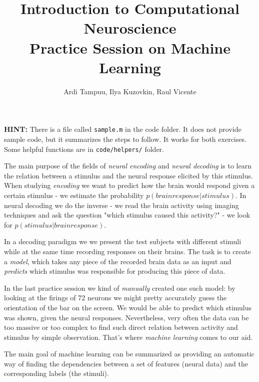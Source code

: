 \documentclass[a4paper,11pt]{article}
\author{\large{Ardi Tampuu, Ilya Kuzovkin, Raul Vicente}}
\title{\huge{Introduction to Computational Neuroscience}\\\LARGE{Practice Session on Machine Learning}}
\begin{document}
\maketitle

\textbf{HINT: } There is a file called \texttt{sample.m} in the code folder. It does not provide sample code, but it summarizes the steps to follow. It works for both exercises. Some helpful functions are in \texttt{code/helpers/} folder.

\vspace{0.8cm}
%
%
The main purpose of the fields of \emph{neural encoding} and \emph{neural decoding} is to learn the relation between a stimulus and the neural response elicited by this stimulus. When studying \emph{encoding} we want to predict how the brain would respond given a certain stimulus - we estimate the probability $p(brain response | stimulus)$. In neural decoding we do the inverse - we read the brain activity using imaging techniques and ask the question "which stimulus caused this activity?" - we look for $p(stimulus | brain response)$. 

In a decoding paradigm we we present the test subjects with different stimuli while at the same time recording responses on their brains. The task is to create a \emph{model}, which takes any piece of the recorded brain data as an input and \emph{predicts} which stimulus was responsible for producing this piece of data.

In the last practice session we kind of \emph{manually} created one such model: by looking at the firings of 72 neurons we might pretty accurately guess the orientation of the bar on the screen. We would be able to predict which stimulus was shown, given the neural responses. Nevertheless, very often the data can be too massive or too complex to find such direct relation between activity and stimulus by simple observation. That's where \emph{machine learning} comes to our aid.

The main goal of machine learning can be summarized as providing an automatic way of finding the dependencies between a set of features (neural data) and the corresponding labels (the stimuli).\\
\end{document}
